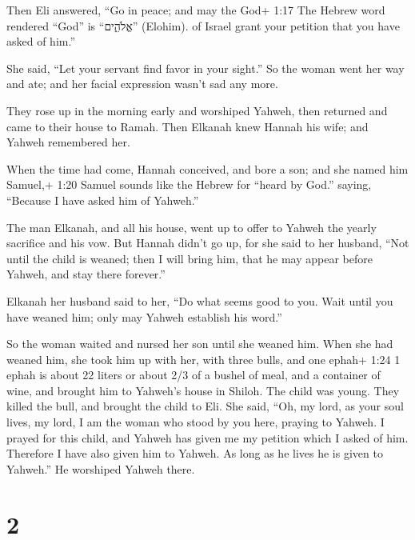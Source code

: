  Then Eli answered, ``Go in peace; and may the God+ 1:17
The Hebrew word rendered ``God'' is ``אֱלֹהִ֑ים'' (Elohim). of Israel
grant your petition that you have asked of him.''

 She said, ``Let your servant find favor in your sight.''
So the woman went her way and ate; and her facial expression wasn't sad
any more.

 They rose up in the morning early and worshiped Yahweh,
then returned and came to their house to Ramah. Then Elkanah knew Hannah
his wife; and Yahweh remembered her.

 When the time had come, Hannah conceived, and bore a son;
and she named him Samuel,+ 1:20 Samuel sounds like the Hebrew for
``heard by God.'' saying, ``Because I have asked him of Yahweh.''

 The man Elkanah, and all his house, went up to offer to
Yahweh the yearly sacrifice and his vow.  But Hannah didn't
go up, for she said to her husband, ``Not until the child is weaned;
then I will bring him, that he may appear before Yahweh, and stay there
forever.''

 Elkanah her husband said to her, ``Do what seems good to
you. Wait until you have weaned him; only may Yahweh establish his
word.''

So the woman waited and nursed her son until she weaned him.
 When she had weaned him, she took him up with her, with
three bulls, and one ephah+ 1:24 1 ephah is about 22 liters or about 2/3
of a bushel of meal, and a container of wine, and brought him to
Yahweh's house in Shiloh. The child was young.  They killed
the bull, and brought the child to Eli.  She said, ``Oh, my
lord, as your soul lives, my lord, I am the woman who stood by you here,
praying to Yahweh.  I prayed for this child, and Yahweh has
given me my petition which I asked of him.  Therefore I
have also given him to Yahweh. As long as he lives he is given to
Yahweh.'' He worshiped Yahweh there.

\hypertarget{section-1}{%
\section{2}\label{section-1}}

